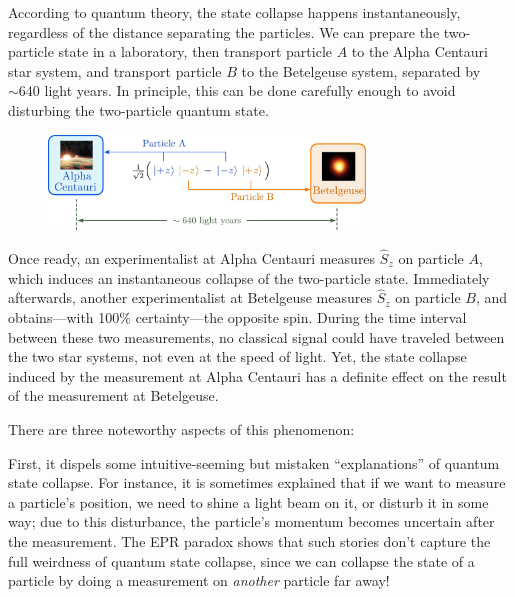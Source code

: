 \documentclass[pra,12pt]{revtex4}
\begin{document}
According to quantum theory, the state collapse happens
instantaneously, regardless of the distance separating the particles.
We can prepare the two-particle state in a laboratory, then transport
particle $A$ to the Alpha Centauri star system, and transport particle
$B$ to the Betelgeuse system, separated by $\sim 640$ light years.  In
principle, this can be done carefully enough to avoid disturbing the
two-particle quantum state.

\begin{figure}[h]
  \centering\includegraphics[width=0.75\textwidth]{epr}
\end{figure}

Once ready, an experimentalist at Alpha Centauri measures $\hat{S}_z$
on particle $A$, which induces an instantaneous collapse of the
two-particle state.  Immediately afterwards, another experimentalist
at Betelgeuse measures $\hat{S}_z$ on particle $B$, and obtains---with
100\% certainty---the opposite spin.  During the time interval between
these two measurements, no classical signal could have traveled
between the two star systems, not even at the speed of light.  Yet,
the state collapse induced by the measurement at Alpha Centauri has a
definite effect on the result of the measurement at Betelgeuse.

There are three noteworthy aspects of this phenomenon:

First, it dispels some intuitive-seeming but mistaken ``explanations''
of quantum state collapse.  For instance, it is sometimes explained
that if we want to measure a particle's position, we need to shine a
light beam on it, or disturb it in some way; due to this disturbance,
the particle's momentum becomes uncertain after the measurement.  The
EPR paradox shows that such stories don't capture the full weirdness
of quantum state collapse, since we can collapse the state of a
particle by doing a measurement on \textit{another} particle far away!
\end{document}
